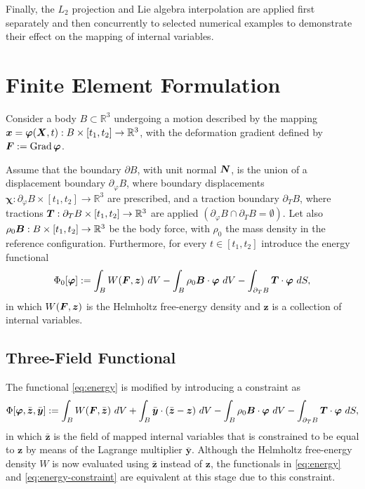 \documentclass[12pt]{article}
\newcommand{\mbs}[1]{\boldsymbol{#1}}
\newcommand{\mbb}[1]{\mathbb{#1}}
\def\by{{\mbs{y}}} \def\bz{{\mbs{z}}}
\def\bvarphi{{\mbs{\varphi}}}
\def\bchi{{\mbs{\chi}}}
\DeclareMathOperator{\Grad}{Grad}
\begin{document}
Finally, the $L_2$ projection and Lie algebra interpolation are applied first
separately and then concurrently to selected numerical examples to demonstrate
their effect on the mapping of internal variables.


\section{Finite Element Formulation}
\label{sec:FE-formulation}

Consider a body $B\subset\mbb{R}^3$ undergoing a motion described by
the mapping $\bx = \bvarphi(\bX, t): B\times[t_1, t_2]\rightarrow
\mbb{R}^3$, with the deformation gradient defined by $\bF := \Grad
\bvarphi$.

Assume that the boundary $\partial B$, with unit normal $\bN$, is the
union of a displacement boundary $\partial_{\varphi} B$, where
boundary displacements $\bchi : \partial_{\varphi} B\times[t_1,
t_2]\rightarrow \mbb{R}^3$ are prescribed, and a traction boundary
$\partial_T B$, where tractions $\bT: \partial_T B \times[t_1,
t_2]\rightarrow \mbb{R}^3$ are applied $(\partial_{\varphi} B \cap
\partial_T B = \emptyset)$. Let also $\rho_0 \bB: B \times [t_1,
t_2]\rightarrow \mbb{R}^3$ be the body force, with $\rho_0$ the mass
density in the reference configuration.  Furthermore, for every $t \in
[t_1, t_2]$ introduce the energy functional
\begin{equation}\label{eq:energy}
  \Phi_0[ \bvarphi ] :=
  \int_B W(\bF, \bz) \ dV
  -
  \int_B \rho_0 \bB \cdot \bvarphi \ dV
  -
  \int_{\partial_T B} \bT \cdot \bvarphi \ dS,
\end{equation}
in which $W(\bF, \bz)$ is the Helmholtz free-energy density and $\bz$
is a collection of internal variables.

\subsection{Three-Field Functional}

The functional \eqref{eq:energy} is modified by introducing a constraint as
\begin{equation}\label{eq:energy-constraint}
  \Phi[ \bvarphi, \bar{\bz}, \bar{\by} ] :=
  \int_B W(\bF, \bar{\bz}) \ dV
  +
  \int_B \bar{\by} \cdot (\bar{\bz} - \bz) \ dV
  -
  \int_B \rho_0 \bB \cdot \bvarphi \ dV
  -
  \int_{\partial_T B} \bT \cdot \bvarphi \ dS,
\end{equation}
in which $\bar{\bz}$ is the field of mapped internal variables that is
constrained to be equal to $\bz$ by means of the Lagrange multiplier
$\bar{\by}$. Although the Helmholtz free-energy density $W$ is now
evaluated using $\bar{\bz}$ instead of $\bz$, the functionals in
\eqref{eq:energy} and \eqref{eq:energy-constraint} are equivalent at
this stage due to this constraint.
\end{document}
